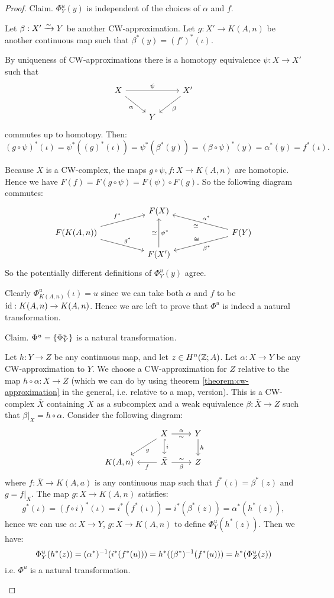\begin{proof}
Claim. $\Phi^u_Y(y)$ is independent of the choices of $\alpha$ and $f$.

\begin{claimproof}
Let $\beta:X'\xrightarrow{\sim}Y$ be another CW-approximation. Let $g:X'\to K(A,n)$ be another continuous map such that $\beta^*(y)=(f')^*(\iota)$.

By uniqueness of CW-approximations there is a homotopy equivalence $\psi:X\to X'$ such that
\[
\begin{tikzcd}
X \ar[dr,"\alpha"'] \ar[rr,"\psi"] & & X' \ar[dl,"\beta"]\\
& Y &
\end{tikzcd}
\]
commutes up to homotopy. Then:
\[(g\circ\psi)^*(\iota)=\psi^*((g)^*(\iota))=\psi^*(\beta^*(y))=(\beta\circ\psi)^*(y)=\alpha^*(y)=f^*(\iota).\]

Because $X$ is a CW-complex, the maps $g\circ\psi,f:X\to K(A,n)$ are homotopic. Hence we have $F(f)=F(g\circ\psi)=F(\psi)\circ F(g)$. So the following diagram commutes:
\[
\begin{tikzcd}[row sep=small,column sep={10em,between origins}]
& F(X) & \\
F(K(A,n)) \ar[ur,"f^*"] \ar[dr,"g^*"] & & F(Y) \ar[ul,"\alpha^*"',"\cong"] \ar[dl,"\beta^*","\cong"']\\
& F(X') \ar[uu,"\cong","\psi^*"']
\end{tikzcd}
\]
So the potentially different definitions of $\Phi^u_Y(y)$ agree.
\end{claimproof}

Clearly $\Phi^u_{K(A,n)}(\iota)=u$ since we can take both $\alpha$ and $f$ to be $\operatorname{id}:K(A,n)\to K(A,n)$. Hence we are left to prove that $\Phi^u$ is indeed a natural transformation.

Claim. $\Phi^u=\{\Phi^u_Y\}$ is a natural transformation.

\begin{claimproof}
Let $h:Y\to Z$ be any continuous map, and let $z\in H^n({\mathbb Z};A)$. Let $\alpha:X\to Y$ be any CW-approximation to $Y$. We choose a CW-approximation for $Z$ relative to the map $h\circ\alpha:X\to Z$ (which we can do by using theorem \ref{theorem:cw-approximation} in the general, i.e. relative to a map, version). This is a CW-complex $\bar X$ containing $X$ as a subcomplex and a weak equivalence $\beta:\bar X\to Z$ such that $\beta|_X=h\circ\alpha$. Consider the following diagram:
\[
\begin{tikzcd}
& X \ar[dl,"g"] \ar[d,hook,"i"]\ar[r,"\sim"',"\alpha"] & Y \ar[d,"h"]\\
K(A,n) & \bar X \ar[l,"f"] \ar[r,"\sim","\beta"'] & Z
\end{tikzcd}
\]
where $f:\bar X\to K(A,a)$ is any continuous map such that $f^*(\iota)=\beta^*(z)$ and $g=f|_X$. The map $g:X\to K(A,n)$ satisfies:
\[g^*(\iota)=(f\circ i)^*(\iota)=i^*(f^*(\iota))=i^*(\beta^*(z))=\alpha^*(h^*(z)),\]
hence we can use $\alpha:X\to Y$, $g:X\to K(A,n)$ to define $\Phi^u_Y(h^*(z))$. Then we have: \[\Phi^u_Y(h^*(z))=(\alpha^*)^{-1}(i^*(f^*(u)))=h^*((\beta^*)^{-1}(f^*(u)))=h^*(\Phi^u_Z(z))\]
i.e. $\Phi^u$ is a natural transformation.
\end{claimproof}
\end{proof}

